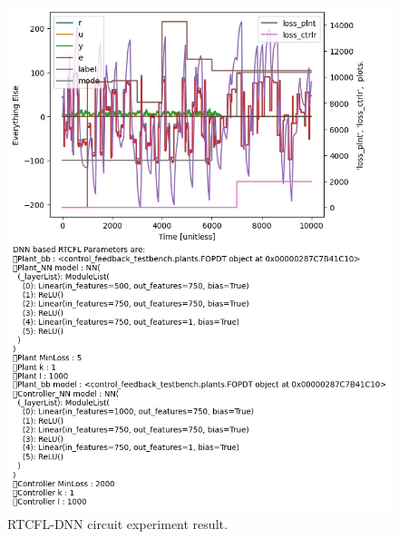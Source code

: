\documentclass[10pt,twocolumn,letterpaper]{article}
\begin{document}
            \begin{figure}[h]
                \includegraphics[width=\linewidth]{figures/output_plot_2022May03175654.jpg}
                \centering
                \caption{RTCFL-DNN circuit experiment result.}
                \label{dnnOut}
            \end{figure}
\end{document}
